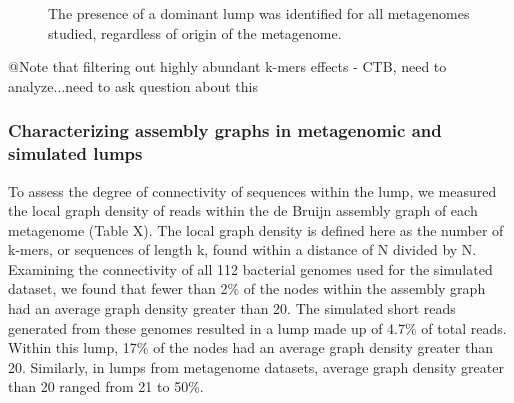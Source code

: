 \documentclass[11pt]{article} %
\begin{document}
\begin{figure}
\caption{The presence of a dominant lump was identified for all metagenomes studied, regardless of origin of the metagenome.}
\end{figure}

@Note that filtering out highly abundant k-mers effects - CTB, need to analyze...need to ask question about this

\subsubsection{Characterizing assembly graphs in metagenomic and simulated lumps}

To assess the degree of connectivity of sequences within the lump, we measured the local graph density of reads within the de Bruijn assembly graph of each metagenome (Table X).  The local graph density is defined here as the number of k-mers, or sequences of length k, found within a distance of N divided by N.  Examining the connectivity of all 112 bacterial genomes used for the simulated dataset, we found that fewer than 2\% of the nodes within the assembly graph had an average graph density greater than 20.   The simulated short reads generated from these genomes resulted in a lump made up of 4.7\% of total reads.  Within this lump, 17\% of the nodes had an average graph density greater than 20.  Similarly, in lumps from metagenome datasets, average graph density greater than 20 ranged from 21 to 50\%.  
\end{document}
